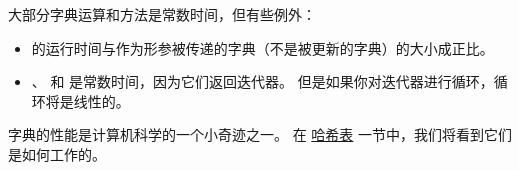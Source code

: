 
大部分字典运算和方法是常数时间，但有些例外：

\begin{itemize}


\item {} 的运行时间与作为形参被传递的字典（不是被更新的字典）的大小成正比。


\item {}、  和  是常数时间，因为它们返回迭代器。
   但是如果你对迭代器进行循环，循环将是线性的。

\end{itemize}


字典的性能是计算机科学的一个小奇迹之一。
在 \hyperref[hashtable]{哈希表} 一节中，我们将看到它们是如何工作的。

